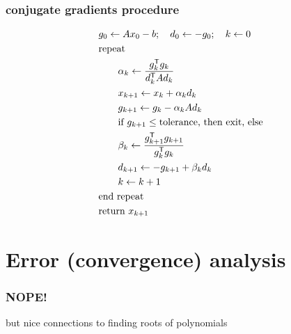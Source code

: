 \documentclass[10pt,dvipsnames*]{beamer}
\begin{document}
%
\begin{frame}
  \frametitle{conjugate gradients procedure}
  \vspace{-0.25cm}
  \begin{align*}
    & {g}_0 \gets {A x}_0 - b;\quad {d}_0 \gets -{g}_0; \quad k \gets 0 \\
    & \text{repeat} \\
    & \qquad \alpha_k \gets \frac{{g}_k^\mathsf{T} {g}_k}{{d}_k^\mathsf{T} {A d}_k}  \\
    & \qquad {x}_{k+1} \gets {x}_k + \alpha_k {d}_k \\
    & \qquad {g}_{k+1} \gets {g}_k - \alpha_k {A d}_k \\
    & \qquad \hbox{if } {g}_{k+1} \leq \text{tolerance, then exit, else} \\
    & \qquad \beta_k \gets \frac{{g}_{k+1}^\mathsf{T} {g}_{k+1}}{{g}_k^\mathsf{T} {g}_k} \\
    & \qquad {d}_{k+1} \gets -{g}_{k+1} + \beta_k {d}_k \\
    & \qquad k \gets k + 1 \\
    & \text{end repeat} \\
    & \text{return } {x}_{k+1}
  \end{align*}
  \cite{wikipedia_cg}
\end{frame}
%
\section{Error (convergence) analysis}
\label{sec:error-analysis}
%
\begin{frame}
  \frametitle{NOPE!}
  but nice connections to finding roots of polynomials
\end{frame}
%
%
%
\end{document}
